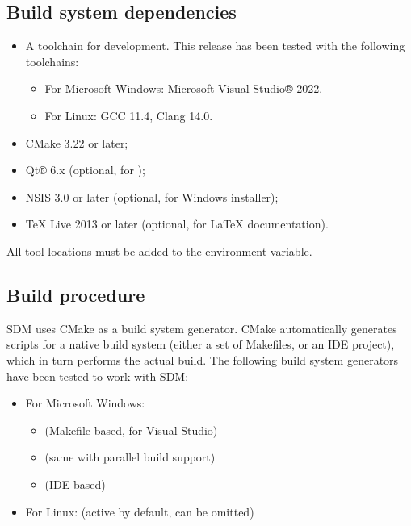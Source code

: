 \documentclass[a4paper,12pt,twoside,extrafontsizes]{memoir}
\begin{document}
\subsection{Build system dependencies}
\label{subsec:dependencies}

\begin{itemize}
	\item A toolchain for \cplusplus{} development. This release has been tested with the following toolchains:
		\begin{itemize}
			\item For Microsoft Windows: Microsoft Visual Studio® 2022.
			\item For Linux: GCC 11.4, Clang 14.0.
		\end{itemize}
	\item CMake 3.22 or later;
	\item Qt® 6.x (optional, for );
	\item NSIS 3.0 or later (optional, for Windows installer);
	\item TeX Live 2013 or later (optional, for \LaTeX{} documentation).
\end{itemize}

All tool locations must be added to the  environment variable.

\subsection{Build procedure}

SDM uses CMake as a build system generator. CMake automatically generates scripts for a native build system (either a set of Makefiles, or an IDE project), which in turn performs the actual build. The following build system generators have been tested to work with SDM:

\begin{itemize}
	\item For Microsoft Windows:
	\begin{itemize}
		\item {} (Makefile-based, for Visual Studio)
		\item {} (same with parallel build support)
		\item {} (IDE-based)
	\end{itemize}
	\item For Linux:  (active by default, can be omitted)
\end{itemize}
\end{document}
